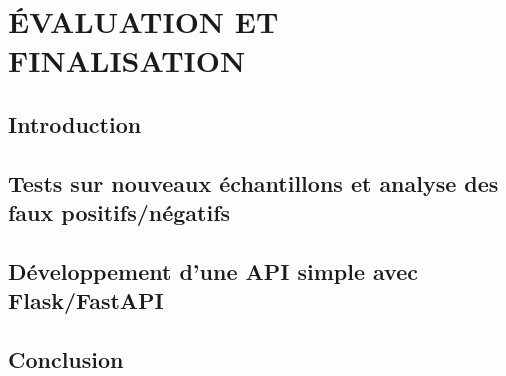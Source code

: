\chapter{ÉVALUATION ET FINALISATION}
\section*{Introduction}
\section{Tests sur nouveaux échantillons et analyse des faux positifs/négatifs}
\section{Développement d’une API simple avec Flask/FastAPI}
\section*{Conclusion}
